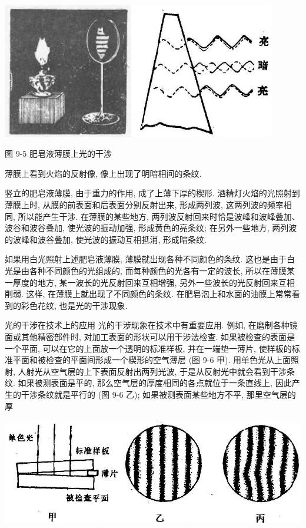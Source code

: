 \documentclass[10pt]{article}
\begin{document}
\begin{center}
\includegraphics[max width=0.9\textwidth]{images/01913056-1f15-74d8-9184-9aab52c9d66b_304_537797.jpg}
\end{center}

图 9-5 肥皂液薄膜上光的干涉

薄膜上看到火焰的反射像, 像上出现了明暗相间的条纹.

竖立的肥皂液薄膜, 由于重力的作用, 成了上薄下厚的楔形. 酒精灯火焰的光照射到薄膜上时, 从膜的前表面和后表面分别反射出来, 形成两列波, 这两列波的频率相同, 所以能产生干涉. 在薄膜的某些地方, 两列波反射回来时恰是波峰和波峰叠加、波谷和波谷叠加, 使光波的振动加强, 形成黄色的亮条纹; 在另外一些地方, 两列波的波峰和波谷叠加, 使光波的振动互相抵消, 形成暗条纹.

如果用白光照射上述肥皂液薄膜, 薄膜就出现各种不同颜色的条纹. 这也是由于白光是由各种不同颜色的光组成的, 而每种颜色的光各有一定的波长, 所以在薄膜某一厚度的地方, 某一波长的光反射回来互相增强, 另外一些波长的光反射回来互相削弱. 这样, 在薄膜上就出现了不同颜色的条纹. 在肥皂泡上和水面的油膜上常常看到的彩色花纹, 也是光的干涉现象.

光的干涉在技术上的应用 光的干涉现象在技术中有重要应用. 例如, 在磨制各种镜面或其他精密部件时, 对加工表面的形状可以用干涉法检查. 如果被检查的表面是一个平面, 可以在它的上面放一个透明的标准样板, 并在一端垫一薄片, 使样板的标准平面和被检查的平面间形成一个楔形的空气薄层 (图 9-6 甲). 用单色光从上面照射, 人射光从空气层的上下表面反射出两列光波, 于是从反射光中就会看到干涉条纹. 如果被测表面是平的, 那么空气层的厚度相同的各点就位于一条直线上, 因此产生的干涉条纹就是平行的 (图 9-6 乙); 如果被测表面某些地方不平, 那里空气层的厚

\begin{center}
\includegraphics[max width=1.0\textwidth]{images/01913056-1f15-74d8-9184-9aab52c9d66b_305_983233.jpg}
\end{center}
\end{document}
